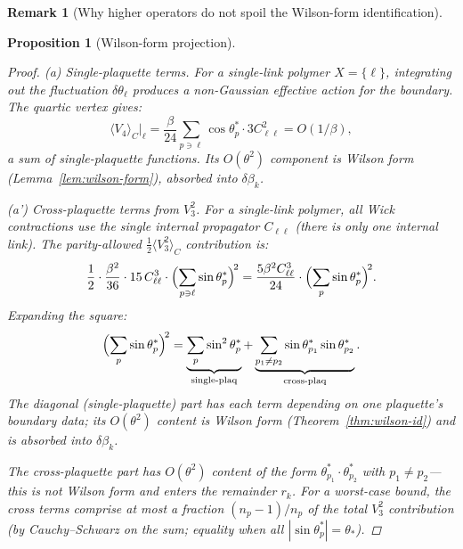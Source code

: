 \documentclass[11pt]{article}
\newtheorem{proposition}[theorem]{Proposition}
\theoremstyle{definition}
\newtheorem{remark}[theorem]{Remark}
\begin{document}
\begin{remark}[Why higher operators do not spoil the Wilson-form identification]
\begin{proposition}[Wilson-form projection]
\begin{enumerate}[nosep,label=(\roman*)]
\begin{proof}
\emph{(a) Single-plaquette terms.}
For a single-link polymer $X=\{\ell\}$, integrating out
the fluctuation $\delta\theta_\ell$ produces a non-Gaussian
effective action for the boundary.  The quartic vertex gives:
\begin{equation}
\langle V_4\rangle_C\big|_\ell
=\frac{\beta}{24}\sum_{p\ni\ell}\cos\theta_p^*\cdot
3C_{\ell\ell}^2=O(1/\beta),
\end{equation}
a sum of single-plaquette functions.
Its $O(\theta^2)$ component is
Wilson form (Lemma~\ref{lem:wilson-form}), absorbed into
$\delta\beta_k$.

\emph{(a') Cross-plaquette terms from $V_3^2$.}
For a single-link polymer, all Wick contractions use
the single internal propagator $C_{\ell\ell}$
(there is only one internal link).  The parity-allowed
$\frac{1}{2}\langle V_3^2\rangle_C$ contribution is:
\begin{equation}\label{eq:V3sq}
\frac{1}{2}\cdot\frac{\beta^2}{36}\cdot
15\,C_{\ell\ell}^3\cdot
\Bigl(\sum_{p\ni\ell}\sin\theta_p^*\Bigr)^{\!2}
=\frac{5\beta^2C_{\ell\ell}^3}{24}\cdot
\Bigl(\sum_p\sin\theta_p^*\Bigr)^{\!2}.
\end{equation}
Expanding the square:
\begin{equation}
\Bigl(\sum_p\sin\theta_p^*\Bigr)^{\!2}
=\underbrace{\sum_p\sin^2\theta_p^*}
_{\text{single-plaq}}
+\underbrace{\sum_{p_1\ne p_2}
\sin\theta_{p_1}^*\sin\theta_{p_2}^*}
_{\text{cross-plaq}}.
\end{equation}
The diagonal (single-plaquette) part has each term depending on
one plaquette's boundary data; its $O(\theta^2)$ content is
Wilson form (Theorem~\ref{thm:wilson-id}) and is absorbed into $\delta\beta_k$.

The cross-plaquette part has $O(\theta^2)$ content of the form
$\theta_{p_1}^*\cdot\theta_{p_2}^*$ with $p_1\ne p_2$---this
is not Wilson form and enters the remainder $r_k$.
For a worst-case bound, the cross terms comprise at most a
fraction $(n_p{-}1)/n_p$ of the total $V_3^2$ contribution
(by Cauchy--Schwarz on the sum; equality when all
$|\sin\theta_p^*|=\theta_*$).


\end{proof}
\end{enumerate}
\end{proposition}
\end{remark}
\end{document}

